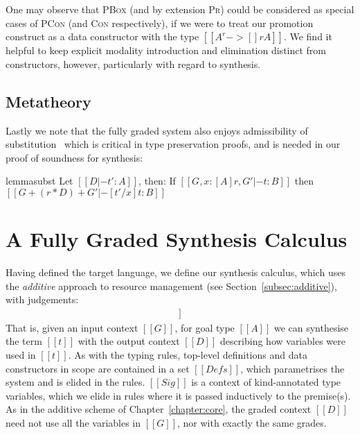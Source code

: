 One may observe that \textsc{PBox} (and by extension \textsc{Pr}) could be
considered as special cases of \textsc{PCon} (and \textsc{Con} respectively), if
we were to treat our promotion construct as a data constructor with the type $[[
A ^ r -> {[] r A} ]]$. We find it helpful to keep explicit modality introduction
and elimination distinct from constructors, however, particularly with regard to
synthesis.

\subsection{Metatheory}
Lastly we note that the fully graded system also enjoys admissibility of
substitution~\citep{DBLP:journals/pacmpl/AbelB20}
which is critical in type preservation proofs,
and is needed in our proof of soundness for synthesis:
%
\begin{restatable}{lemma}{subst}
\label{lemma:substitution}
Let $[[ D |- t' : A]]$, then:
If $[[ {G, x : [A] r} , G' |- t : B]]$
then $[[ G + (r * D) + G' |- [ t' / x ] t : B ]]$
\end{restatable}


\section{A Fully Graded Synthesis Calculus}
\label{section:graded-base-synthesis}

Having defined the target language, we define our synthesis calculus, which uses
the \emph{additive} approach to resource management (see
Section~\ref{subsec:additive}), with judgements:
%
\begin{align*}
[[ Sig; G |- A =>+ t ; D ]]
\end{align*}
%
That is, given an input context $[[ G ]]$, for goal type $[[ A ]]$ we can
synthesise the term $[[ t ]]$ with the output context $[[ D ]]$ describing how
variables were used in $[[ t ]]$. As with the typing rules, top-level
definitions and data constructors in scope are contained in a set $[[ Defs ]]$,
which parametrises the system and is elided in the rules. $[[ Sig ]]$ is a
context of kind-annotated type variables, which we elide in rules where it is
passed inductively to the premise(s). As in the additive scheme of
Chapter~\ref{chapter:core}, the graded context $[[ D ]]$ need not use all the
variables in $[[ G ]]$, nor with exactly the same grades. 

